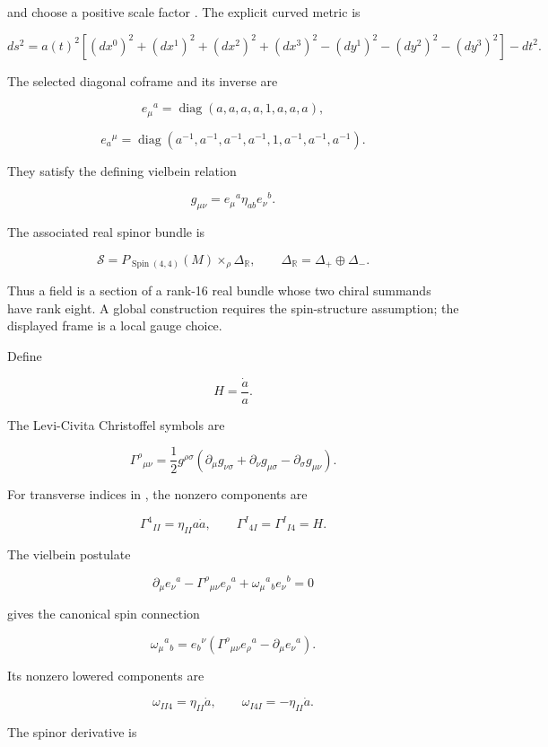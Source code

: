 \documentclass[11pt]{article}
\begin{document}
and choose a positive scale factor \texttt{}. The explicit curved metric is

\[
ds^2=a(t)^2\left[(dx^0)^2+(dx^1)^2+(dx^2)^2+(dx^3)^2
-(dy^1)^2-(dy^2)^2-(dy^3)^2\right]-dt^2.
\]

The selected diagonal coframe and its inverse are

\[
e_\mu{}^a=\operatorname{diag}(a,a,a,a,1,a,a,a),
\]

\[
e_a{}^\mu=\operatorname{diag}
(a^{-1},a^{-1},a^{-1},a^{-1},1,a^{-1},a^{-1},a^{-1}).
\]

They satisfy the defining vielbein relation

\[
g_{\mu\nu}=e_\mu{}^a\eta_{ab}e_\nu{}^b.
\]

The associated real spinor bundle is

\[
\mathcal S=P_{\operatorname{Spin}(4,4)}(M)
\mathbin{\times}_\rho\Delta_{\mathbb R},
\qquad
\Delta_{\mathbb R}=\Delta_+\oplus\Delta_-.
\]

Thus a field \texttt{} is a section of a rank-16 real bundle whose two chiral summands have rank eight. A global construction requires the spin-structure assumption; the displayed frame is a local gauge choice.

Define

\[
H=\frac{\dot a}{a}.
\]

The Levi-Civita Christoffel symbols are

\[
\Gamma^\rho{}_{\mu\nu}
=\frac12g^{\rho\sigma}
\left(\partial_\mu g_{\nu\sigma}
+\partial_\nu g_{\mu\sigma}
-\partial_\sigma g_{\mu\nu}\right).
\]

For transverse indices \texttt{} in \texttt{}, the nonzero components are

\[
\Gamma^4{}_{II}=\eta_{II}a\dot a,
\qquad
\Gamma^I{}_{4I}=\Gamma^I{}_{I4}=H.
\]

The vielbein postulate

\[
\partial_\mu e_\nu{}^a
-\Gamma^\rho{}_{\mu\nu}e_\rho{}^a
+\omega_\mu{}^a{}_b e_\nu{}^b=0
\]

gives the canonical spin connection

\[
\omega_\mu{}^a{}_b
=e_b{}^\nu\left(
\Gamma^\rho{}_{\mu\nu}e_\rho{}^a
-\partial_\mu e_\nu{}^a\right).
\]

Its nonzero lowered components are

\[
\omega_{II4}=\eta_{II}\dot a,
\qquad
\omega_{I4I}=-\eta_{II}\dot a.
\]

The spinor derivative is
\end{document}
